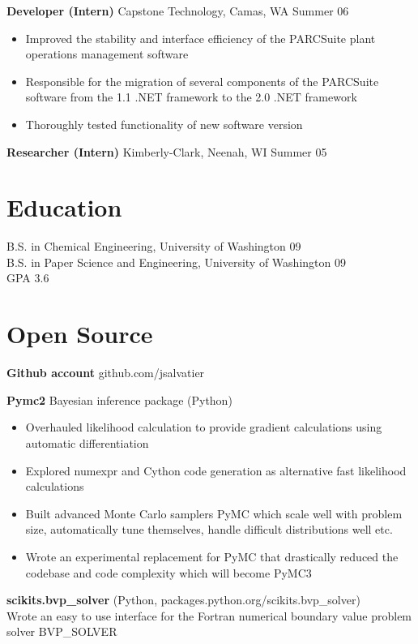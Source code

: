\documentclass[margin]{res}
\begin{document}
\begin{resume}
  {\bf Developer (Intern)} Capstone Technology, Camas, WA \hfill  Summer 06
    \vspace{6pt}
  \begin{itemize} \itemsep -2pt
    \item Improved the stability and interface efficiency of the PARCSuite plant operations management software 
    \item Responsible for the migration of several components of the PARCSuite software from the 1.1 .NET framework to the 2.0 .NET framework 
    \item Thoroughly tested functionality of new software version 
   \end{itemize}

  {\bf Researcher (Intern)} Kimberly-Clark, Neenah, WI \hfill  Summer 05

\section{Education} 
  B.S. in Chemical Engineering, University of Washington 09 \\
  B.S. in Paper Science and Engineering, University of Washington 09\\
  GPA 3.6 
 
\section{Open Source}
  {\bf Github account} github.com/jsalvatier 

  {\bf Pymc2} Bayesian inference package (Python) 
    \vspace{6pt}
  \begin{itemize} \itemsep -2pt
    \item Overhauled likelihood calculation to provide gradient calculations using automatic differentiation
    \item Explored numexpr and Cython code generation as alternative fast likelihood calculations
    \item Built advanced Monte Carlo samplers PyMC which scale well with problem size, automatically tune themselves, handle difficult distributions well etc.
    \item Wrote an experimental replacement for PyMC that drastically reduced the codebase and code complexity which will become PyMC3
   \end{itemize}

  {\bf scikits.bvp\_solver} (Python, packages.python.org/scikits.bvp\_solver) \\ 
    \vspace{6pt}
    Wrote an easy to use interface for the Fortran numerical boundary value problem solver BVP\_SOLVER 
  

\end{resume} 
\end{document}
